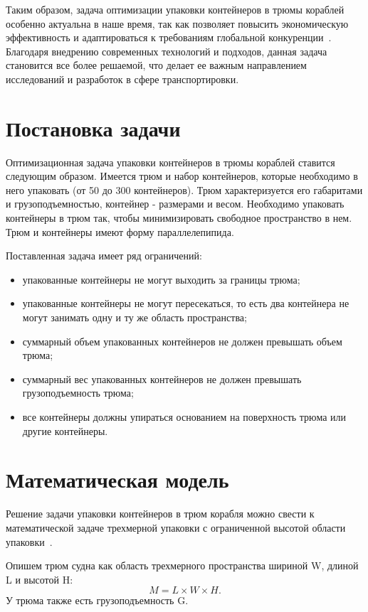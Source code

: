 Таким образом, задача оптимизации упаковки контейнеров в трюмы кораблей особенно актуальна в наше время, так как позволяет повысить экономическую эффективность и адаптироваться к требованиям глобальной конкуренции~\cite{actual}. Благодаря внедрению современных технологий и подходов, данная задача становится все более решаемой, что делает ее важным направлением исследований и разработок в сфере транспортировки.

\section{Постановка задачи}
Оптимизационная задача упаковки контейнеров в трюмы кораблей ставится следующим образом. Имеется трюм и набор контейнеров, которые необходимо в него упаковать (от 50 до 300 контейнеров). Трюм характеризуется его габаритами и грузоподъемностью, контейнер - размерами и весом. Необходимо упаковать контейнеры в трюм так, чтобы минимизировать свободное пространство в нем. Трюм и контейнеры имеют форму параллелепипида.

Поставленная задача имеет ряд ограничений:
\begin{itemize}
	\item упакованные контейнеры не могут выходить за границы трюма;
	\item упакованные контейнеры не могут пересекаться, то есть два контейнера не могут занимать одну и ту же область пространства;
	\item суммарный объем упакованных контейнеров не должен превышать объем трюма;
    \item суммарный вес упакованных контейнеров не должен превышать грузоподъемность трюма;
	\item все контейнеры должны упираться основанием на поверхность трюма или другие контейнеры.
\end{itemize}

\section{Математическая модель}

Решение задачи упаковки контейнеров в трюм корабля можно свести к математической задаче трехмерной упаковки с ограниченной высотой области упаковки~\cite{genetic}\cite{gibrid}.

Опишем трюм судна как область трехмерного пространства шириной W, длиной L и высотой H:
\begin{equation}
	\label{formula:volume}
	M = L \times W \times H.
\end{equation}
У трюма также есть грузоподъемность G.


